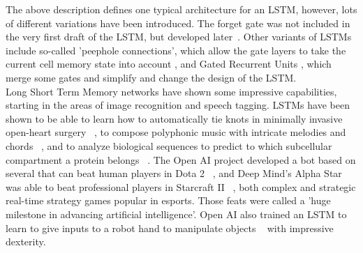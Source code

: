 \documentclass[
	a4paper,
	pagesize,
	pdftex,
	12pt,
	twoside, %
	BCOR=5mm, %
	ngerman,
	fleqn,
	final,
	]{scrartcl}
\begin{document}
The above description defines one typical architecture for an LSTM, however, lots of different variations have been introduced. The forget gate was not included in the very first draft of the LSTM, but developed later~\cite{Gers.1999}. Other variants of LSTMs include so-called 'peephole connections', which allow the gate layers to take the current cell memory state into account \cite{Gers.2000}, and Gated Recurrent Units \cite{Cho.2014}, which merge some gates and simplify and change the design of the LSTM. \\
Long Short Term Memory networks have shown some impressive capabilities, starting in the areas of image recognition and speech tagging. LSTMs have been shown to be able to learn how to automatically tie knots in minimally invasive open-heart surgery ~\cite{Mayer.2008}, to compose polyphonic music with intricate melodies and chords ~\cite{Kumar.2019}, and to analyze biological sequences to predict to which subcellular compartment a protein belongs ~\cite{Snderby.2015}. The Open AI project developed a bot based on several that can beat human players in Dota 2 ~\cite{Rodriguez.2018}, and Deep Mind's Alpha Star was able to beat professional players in Starcraft II ~\cite{Stanford.2019}, both complex and strategic real-time strategy games popular in esports. Those feats were called a 'huge milestone in advancing artificial intelligence'. Open AI also trained an LSTM to learn to give inputs to a robot hand to manipulate objects ~\cite{OpenAIBlog.2018} with impressive dexterity.
\end{document}
